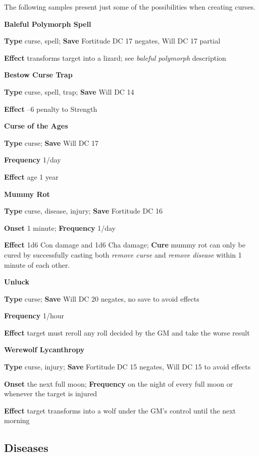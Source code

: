 The following samples present just some of the possibilities when creating curses.
				
\textbf{Baleful Polymorph Spell }
				
\textbf{Type} curse, spell; \textbf{Save} Fortitude DC 17 negates, Will DC 17 partial
				
\textbf{Effect }transforms target into a lizard; see \textit{baleful polymorph} description
				
\textbf{Bestow Curse Trap }
				
\textbf{Type} curse, spell, trap; \textbf{Save} Will DC 14
				
\textbf{Effect }--6 penalty to Strength
				
\textbf{Curse of the Ages }
				
\textbf{Type} curse; \textbf{Save} Will DC 17
				
\textbf{Frequency} 1/day
				
\textbf{Effect }age 1 year
				
\textbf{Mummy Rot }
				
\textbf{Type} curse, disease, injury; \textbf{Save} Fortitude DC 16
				
\textbf{Onset }1 minute; \textbf{Frequency} 1/day
				
\textbf{Effect }1d6 Con damage and 1d6 Cha damage;\textbf{ Cure} mummy rot can only be cured by successfully casting both \textit{remove curse} and \textit{remove disease} within 1 minute of each other.
				
\textbf{Unluck}
				
\textbf{Type} curse; \textbf{Save} Will DC 20 negates, no save to avoid effects
				
\textbf{Frequency} 1/hour
				
\textbf{Effect }target must reroll any roll decided by the GM and take the worse result
				
\textbf{Werewolf Lycanthropy }
				
\textbf{Type} curse, injury; \textbf{Save} Fortitude DC 15 negates, Will DC 15 to avoid effects 
				
\textbf{Onset }the next full moon; \textbf{Frequency} on the night of every full moon or whenever the target is injured
				
\textbf{Effect }target transforms into a wolf under the GM's control until the next morning
				
\subsection{Diseases}

